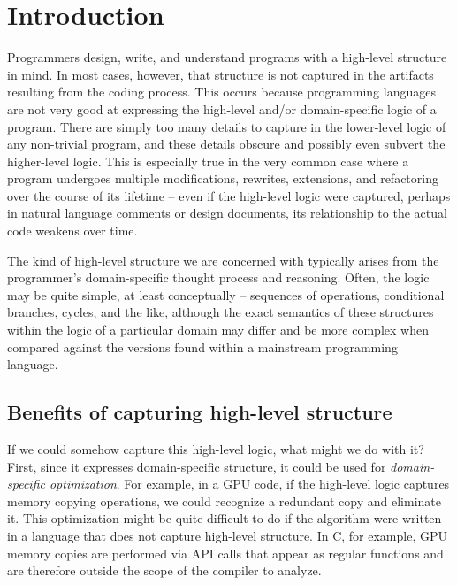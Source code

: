 
\chapter{Introduction}
\label{ch:intro}

Programmers design, write, and understand programs with a
high-level structure in mind. In most cases, however, that
structure is not captured in the artifacts resulting from the
coding process. This occurs because programming languages are not
very good at expressing the high-level and/or domain-specific
logic of a program. There are simply too many details to capture
in the lower-level logic of any non-trivial program, and these
details obscure and possibly even subvert the higher-level logic.
This is especially true in the very common case where a program
undergoes multiple modifications, rewrites, extensions, and
refactoring over the course of its lifetime -- even if the
high-level logic were captured, perhaps in natural language
comments or design documents, its relationship to the actual code
weakens over time.

The kind of high-level structure we are concerned with typically
arises from the programmer's domain-specific thought process and
reasoning. Often, the logic may be quite simple, at least
conceptually -- sequences of operations, conditional branches,
cycles, and the like, although the exact semantics of these
structures within the logic of a particular domain may differ and
be more complex when compared against the versions found within a
mainstream programming language.

\section{Benefits of capturing high-level structure}

If we could somehow capture this high-level logic, what might we
do with it? First, since it expresses domain-specific structure,
it could be used for \emph{domain-specific optimization}. For
example, in a GPU code, if the high-level logic captures memory
copying operations, we could recognize a redundant copy and
eliminate it. This optimization might be quite difficult to do if
the algorithm were written in a language that does not capture
high-level structure. In C, for example, GPU memory copies are
performed via API calls that appear as regular functions and are
therefore outside the scope of the compiler to analyze.

